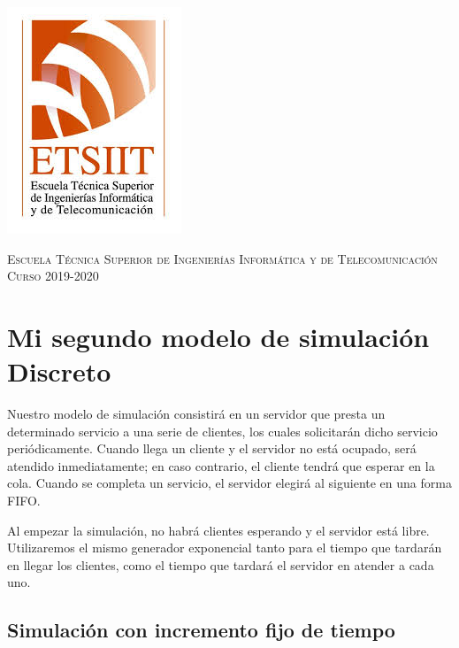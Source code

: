 \documentclass[11pt,a4paper]{report}
\begin{document}
\begin{titlepage}
\begin{minipage}{\textwidth}
\includegraphics[scale=0.3]{img/etsiit.jpeg}

\vspace{0.7cm}
\textsc{Escuela Técnica Superior de Ingenierías Informática y de Telecomunicación}\\
\vspace{1cm}
\textsc{Curso 2019-2020}
\end{minipage}
\end{titlepage}

\tableofcontents
\thispagestyle{empty}				%

\newpage

\setlength{\parskip}{1em}

\chapter{Mi segundo modelo de simulación Discreto}

Nuestro modelo de simulación consistirá en un servidor que presta un determinado servicio a una serie de clientes, los cuales solicitarán dicho servicio
periódicamente. Cuando llega un cliente y el servidor no está ocupado, será atendido inmediatamente; en caso contrario, el cliente tendrá que esperar en
la cola. Cuando se completa un servicio, el servidor elegirá al siguiente en una forma FIFO.

Al empezar la simulación, no habrá clientes esperando y el servidor está libre. Utilizaremos el mismo generador exponencial tanto para el tiempo que tardarán
en llegar los clientes, como el tiempo que tardará el servidor en atender a cada uno.


\section{Simulación con incremento fijo de tiempo}
\end{document}
